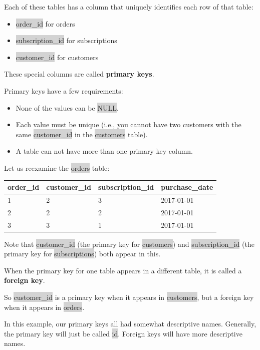 \documentclass[11pt]{article}
\begin{document}
{{Each of these tables has a column that uniquely identifies each row of that table:
\begin{itemize}[leftmargin = *]
\item \colorbox{lightgray}{order\_id} for orders
\item \colorbox{lightgray}{subscription\_id} for subscriptions
\item \colorbox{lightgray}{customer\_id} for customers
\end{itemize}
These special columns are called \textbf{primary keys}.

Primary keys have a few requirements:
\begin{itemize}[leftmargin = *]
\item None of the values can be \colorbox{lightgray}{NULL}.
\item Each value must be unique (i.e., you cannot have two customers with the same \colorbox{lightgray}{customer\_id} in the \colorbox{lightgray}{customers} table).
\item A table can not have more than one primary key column.
\end{itemize}
Let us reexamine the \colorbox{lightgray}{orders} table:

{
\begin{tabular}{ | m{10em} | m{10em} | m{10em} | m{10em} |}
\hline
\textbf{order\_id} & \textbf{customer\_id} & \textbf{subscription\_id} & \textbf{purchase\_date} \\
\hline
1 & 2 & 3 &  2017-01-01\\
\hline
2 & 2 & 2 &  2017-01-01\\
\hline 
3 & 3 & 1 &  2017-01-01\\
\hline 
\end{tabular}

Note that \colorbox{lightgray}{customer\_id} (the primary key for \colorbox{lightgray}{customers}) and \colorbox{lightgray}{subscription\_id} (the primary key for \colorbox{lightgray}{subscriptions}) both appear in this.

When the primary key for one table appears in a different table, it is called a \textbf{foreign key}.

So \colorbox{lightgray}{customer\_id} is a primary key when it appears in \colorbox{lightgray}{customers}, but a foreign key when it appears in \colorbox{lightgray}{orders}.

In this example, our primary keys all had somewhat descriptive names. Generally, the primary key will just be called \colorbox{lightgray}{id}. Foreign keys will have more descriptive names.

}}}
\end{document}
